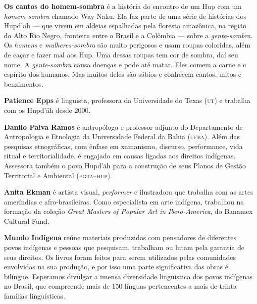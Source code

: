 \textbf{Os cantos do homem-sombra} é a história do encontro de um Hup com um \textit{homem-sombra} chamado Way Naku. Ela faz parte de uma série de histórias dos Hupd'äh --- que vivem em aldeias espalhadas pela floresta amazônica, na região do Alto Rio Negro, fronteira entre o Brasil e a Colômbia --- sobre a \textit{gente-sombra}. Os \textit{homens} e \textit{mulheres-sombra} são muito perigosos e usam roupas coloridas, além de caçar e fazer mal aos Hup. Uma dessas roupas tem cor de sombra, daí seu nome. A \textit{gente-sombra} causa doenças e pode até matar. Eles comem a carne e o espírito dos humanos. Mas muitos deles são sábios e conhecem cantos, mitos e benzimentos. 

\textbf{Patience Epps} ​é linguista, professora da Universidade do Texas \textsc{(ut)} e trabalha com os Hupd'äh desde 2000.

\textbf{Danilo Paiva Ramos} é antropólogo e professor adjunto do Departamento de Antropologia e Etnologia da Universidade Federal da Bahia \textsc{(ufba)}. Além das pesquisas etnográficas, com ênfase em xamanismo, discurso, performance, vida ritual e territorialidade, é engajado em causas ligadas aos direitos indígenas. Assessora também o povo Hupd'äh para a construção de seus Planos de Gestão Territorial e Ambiental (\textsc{pgta--hup}).

\textbf{Anita Ekman} é artista visual, \textit{performer} e ilustradora que trabalha com as artes ameríndias e afro-brasileiras. Como especialista em arte indígena, trabalhou na formação da coleção \textit{Great Masters of Popular Art in Ibero-America}, do Banamex Cultural Fund.

\textbf{Mundo Indígena} reúne materiais produzidos com pensadores de diferentes povos indígenas e pessoas que pesquisam, trabalham ou lutam pela garantia de seus direitos. Os livros foram feitos para serem utilizados pelas comunidades envolvidas na sua produção, e por isso uma parte significativa das obras é bilíngue. Esperamos divulgar a imensa diversidade linguística dos povos indígenas no Brasil, que compreende mais de 150 línguas pertencentes a mais de trinta famílias linguísticas.



